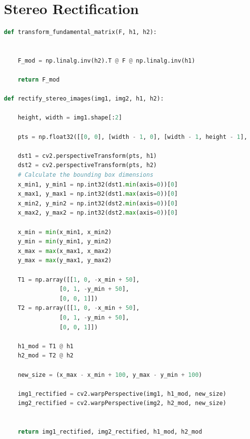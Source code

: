 \section*{Stereo Rectification}
\begin{lstlisting}[language=python]
def transform_fundamental_matrix(F, h1, h2):
    
    
    F_mod = np.linalg.inv(h2).T @ F @ np.linalg.inv(h1)
    
    return F_mod

def rectify_stereo_images(img1, img2, h1, h2):
    
    height, width = img1.shape[:2]
        
    pts = np.float32([[0, 0], [width - 1, 0], [width - 1, height - 1], [0, height - 1]]).reshape(-1, 1, 2)

    dst1 = cv2.perspectiveTransform(pts, h1)
    dst2 = cv2.perspectiveTransform(pts, h2)
    # Calculate the bounding box dimensions
    x_min1, y_min1 = np.int32(dst1.min(axis=0))[0]
    x_max1, y_max1 = np.int32(dst1.max(axis=0))[0]
    x_min2, y_min2 = np.int32(dst2.min(axis=0))[0]
    x_max2, y_max2 = np.int32(dst2.max(axis=0))[0]

    x_min = min(x_min1, x_min2)
    y_min = min(y_min1, y_min2)
    x_max = max(x_max1, x_max2)
    y_max = max(y_max1, y_max2)

    T1 = np.array([[1, 0, -x_min + 50],
                [0, 1, -y_min + 50],
                [0, 0, 1]])
    T2 = np.array([[1, 0, -x_min + 50],
                [0, 1, -y_min + 50],
                [0, 0, 1]])

    h1_mod = T1 @ h1
    h2_mod = T2 @ h2

    new_size = (x_max - x_min + 100, y_max - y_min + 100)

    img1_rectified = cv2.warpPerspective(img1, h1_mod, new_size)
    img2_rectified = cv2.warpPerspective(img2, h2_mod, new_size)


    return img1_rectified, img2_rectified, h1_mod, h2_mod
\end{lstlisting}
